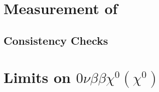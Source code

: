 \documentclass[herrin-thesis.tex]{subfiles}
\begin{document}
\section{Measurement of \twonu}

\subsection{Consistency Checks}

\section{Limits on \(0\nu\beta\beta\chi^0(\chi^0)\)}
\end{document}

